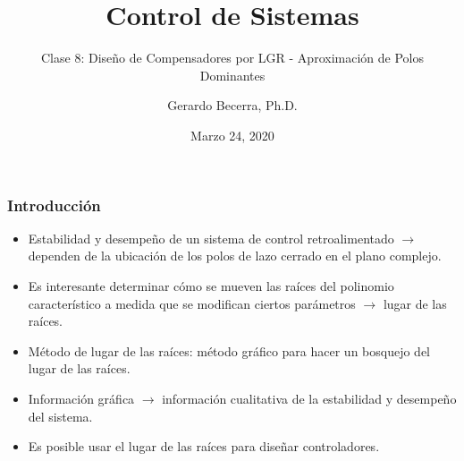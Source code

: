 \documentclass[aspectratio=169,handout]{beamer}
\title{Control de Sistemas}
\subtitle{\small Clase 8: Diseño de Compensadores por LGR - Aproximación de Polos Dominantes}
\author{Gerardo Becerra, Ph.D.}
\institute{Pontificia Universidad Javeriana\\ Departamento de Electrónica}
\date{Marzo 24, 2020}
\theoremstyle{definition}
\theoremstyle{plain}
\theoremstyle{remark}
\begin{document}
\frame{\titlepage}	

\begin{frame}[<+->]\frametitle{Introducción}
\vspace*{5mm}
\centering
\begin{itemize}
	\item Estabilidad y desempeño de un sistema de control retroalimentado $\rightarrow$ dependen de la ubicación de los polos de lazo cerrado en el plano complejo.
	\item Es interesante determinar cómo se mueven las raíces del polinomio característico a medida que se modifican ciertos parámetros $\rightarrow$ lugar de las raíces.
	\item Método de lugar de las raíces: método gráfico para hacer un bosquejo del lugar de las raíces.
	\item Información gráfica $\rightarrow$ información cualitativa de la estabilidad y desempeño del sistema.
	\item Es posible usar el lugar de las raíces para diseñar controladores.
\end{itemize}
\end{frame}
\end{document}
